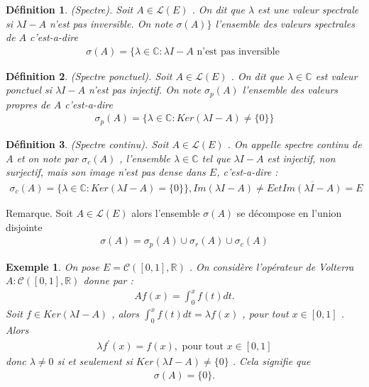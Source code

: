 \documentclass{report}
\newtheorem{Def}{Définition}[subsection]
\newtheorem{Ex}{Exemple}[subsection]
\begin{document}
{\begin{Def} (Spectre). Soit $A \in \mathscr{L}(E)$ . On dit que $\lambda$ est une valeur spectrale si $\lambda I - A$ n'est pas inversible. On note $\sigma(A)\}$ l'ensemble des valeurs spectrales de $A$ c'est-a-dire 
					\begin{align*}
						 \sigma(A) = \{\lambda \in \mathbb{C} : \lambda I - A \,\,\text{n'est pas inversible}\,\, 
					\end{align*}
\end{Def}

\begin{Def} (Spectre ponctuel). Soit $A \in \mathscr{L}(E)$ . On dit que $\lambda \in \mathbb{C}$ est valeur ponctuel si $\lambda I - A$ n'est pas injectif. On note $\sigma_p(A)$ l'ensemble des valeurs propres de $A$ c'est-a-dire 
					\begin{align*}
						 \sigma_p(A) = \{\lambda \in \mathbb{C} : Ker(\lambda I - A) \neq \{0\}\} 
					\end{align*}
\end{Def}

\begin{Def} (Spectre continu). Soit $A \in \mathscr{L}(E)$ . On appelle spectre continu de $A$ et on note par $\sigma_c(A)$ , l'ensemble $\lambda \in \mathbb{C}$ tel que $\lambda I - A$ est injectif, non surjectif, mais son image n'est pas dense dans $E$, c'est-a-dire : 
					\begin{align*}
						 \sigma_c(A) = \{\lambda \in \mathbb{C} : Ker(\lambda I - A) = \{0\} \} , Im(\lambda I - A) \neq E  et \overline{Im(\lambda I - A)} = E 
					\end{align*}
\end{Def}

Remarque. Soit $A \in \mathscr{L}(E)$ alors l'ensemble $\sigma(A)$ se décompose en l'union disjointe 
					\begin{align*}
						 \sigma(A) = \sigma_p(A) \cup \sigma_r(A) \cup \sigma_c(A) 
					\end{align*}




\begin{Ex} On pose $E = \mathscr{C}([0,1],\mathbb{R})$ . On considère l'opérateur de Volterra $A : \mathscr{C}([0,1],\mathbb{R})$ donne par : 
					\begin{align*}
						 A f(x) = \int_{0}^{x} f(t) dt .
					\end{align*}
	Soit $f \in Ker(\lambda I - A)$ , alors $\int_{0}^{x} f(t)dt = \lambda f(x)$ , pour tout $x \in [0,1]$ . Alors 
					\begin{align*}
						 \lambda f^{'}(x) = f(x) , \,\,\text{pour tout}\,\, x \in [0,1] 
					\end{align*}
	donc $\lambda \neq 0$ si et seulement si $Ker(\lambda I - A) \neq \{0\}$ . Cela signifie que 
					\begin{align*}
						 \sigma(A) = \{0\} .
					\end{align*}
\end{Ex}

}
\end{document}
